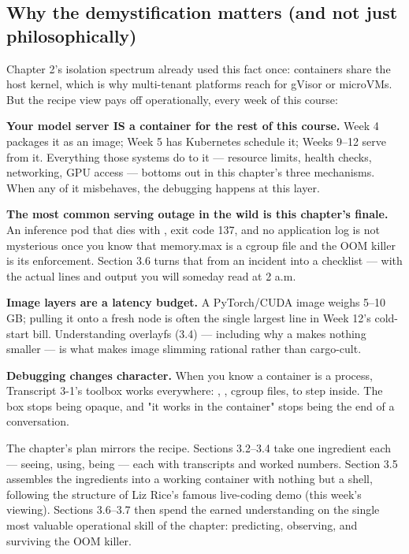 \subsection*{Why the demystification matters (and not just philosophically)}

Chapter 2's isolation spectrum already used this fact once: containers share the host kernel, which is why multi-tenant platforms reach for gVisor or microVMs. But the recipe view pays off operationally, every week of this course:

\begin{tbbitemize}
  \item \textbf{Your model server IS a container for the rest of this course.} Week 4 packages it as an image; Week 5 has Kubernetes schedule it; Weeks 9–12 serve from it. Everything those systems do to it — resource limits, health checks, networking, GPU access — bottoms out in this chapter's three mechanisms. When any of it misbehaves, the debugging happens at this layer.
  \item \textbf{The most common serving outage in the wild is this chapter's finale.} An inference pod that dies with , exit code 137, and no application log is not mysterious once you know that memory.max is a cgroup file and the OOM killer is its enforcement. Section 3.6 turns that from an incident into a checklist — with the actual  lines and  output you will someday read at 2 a.m.
  \item \textbf{Image layers are a latency budget.} A PyTorch/CUDA image weighs 5–10 GB; pulling it onto a fresh node is often the single largest line in Week 12's cold-start bill. Understanding overlayfs (3.4) — including why a  makes nothing smaller — is what makes image slimming rational rather than cargo-cult.
  \item \textbf{Debugging changes character.} When you know a container is a process, Transcript 3-1's toolbox works everywhere: , , cgroup files,  to step inside. The box stops being opaque, and "it works in the container" stops being the end of a conversation.
\end{tbbitemize}

The chapter's plan mirrors the recipe. Sections 3.2–3.4 take one ingredient each — seeing, using, being — each with transcripts and worked numbers. Section 3.5 assembles the ingredients into a working container with nothing but a shell, following the structure of Liz Rice's famous live-coding demo (this week's viewing). Sections 3.6–3.7 then spend the earned understanding on the single most valuable operational skill of the chapter: predicting, observing, and surviving the OOM killer.

